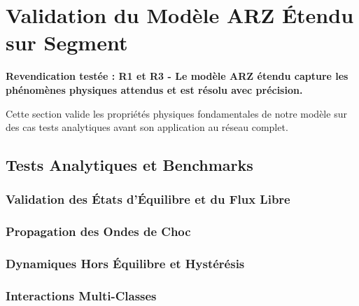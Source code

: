 
\section{Validation du Modèle ARZ Étendu sur Segment}
\label{sec:validation_arz_segment}

\textbf{Revendication testée : R1 et R3 - Le modèle ARZ étendu capture les phénomènes physiques attendus et est résolu avec précision.}

Cette section valide les propriétés physiques fondamentales de notre modèle sur des cas tests analytiques avant son application au réseau complet.

\subsection{Tests Analytiques et Benchmarks}
\label{subsec:tests_analytiques}

\subsubsection{Validation des États d'Équilibre et du Flux Libre}

\subsubsection{Propagation des Ondes de Choc}

\subsubsection{Dynamiques Hors Équilibre et Hystérésis}

\subsubsection{Interactions Multi-Classes}

